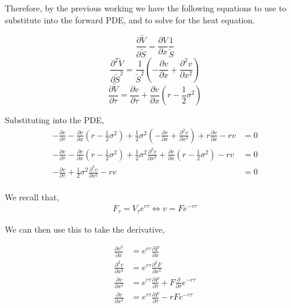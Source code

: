 \documentclass[12pt]{article}
\begin{document}
Therefore, by the previous working we have the following equations to use to substitute into the forward PDE, and to solve for the heat equation.

\begin{equation}
\frac{\partial\tilde{V}}{\partial\tilde{S}} = \frac{\partial V}{\partial x}\frac{1}{\tilde{S}}
\end{equation}
\begin{equation}
\frac{\partial ^2 \tilde{V}}{\partial \tilde{S}^2} = \frac{1}{\tilde{S}^2}\left(-\frac{\partial v}{\partial x} + \frac{\partial ^2 v}{\partial x^2}\right)
\end{equation}
\begin{equation}
\frac{\partial \tilde{V}}{\partial \tau} = \frac{\partial v}{\partial\tau} + \frac{\partial v}{\partial x}\left(r - \frac{1}{2}\sigma^2\right)
\end{equation}

Substituting into the PDE,
\begin{align*}
-\frac{\partial v}{\partial \tau} - \frac{\partial v}{\partial x}\left(r - \frac{1}{2}\sigma^2\right) + \frac{1}{2}\sigma^2\left(-\frac{\partial v}{\partial x}+\frac{\partial ^2v}{\partial x^2}\right) + r\frac{\partial v}{\partial x} - rv &= 0 \\
-\frac{\partial v}{\partial \tau} - \frac{\partial v}{\partial x}\left(r - \frac{1}{2}\sigma ^2\right) + \frac{1}{2} \sigma^2\frac{\partial ^2v}{\partial x^2}+\frac{\partial v}{\partial x}\left(r - \frac{1}{2}\sigma^2\right) - rv & = 0 \\
-\frac{\partial v}{\partial \tau} + \frac{1}{2}\sigma^2\frac{\partial ^2 v}{\partial x^2} - rv &= 0 \\
\end{align*}

We recall that, 
\begin{align*}
F_{\tau} = V_{\tau}e^{r\tau} \iff  v = Fe^{-r\tau}
\end{align*}

We can then use this to take the derivative,

\begin{align*}
\frac{\partial v^2}{\partial x} &= e^{r\tau}\frac{\partial F}{\partial x} \\
\frac{\partial ^2 v}{\partial x^2} &= e^{r\tau}\frac{\partial ^2 F}{\partial x^2} \\
\frac{\partial v}{\partial x^2} &= e^{r\tau}\frac{\partial F}{\partial \tau} + F \frac{\partial}{\partial\tau}e^{-r\tau} \\
\frac{\partial v}{\partial x^2} &= e^{r\tau}\frac{\partial F}{\partial \tau} - rFe^{-r\tau} \\
\end{align*}
\end{document}
